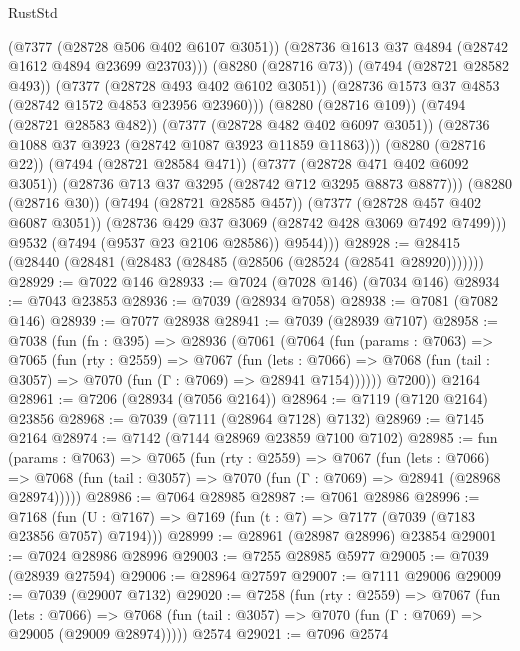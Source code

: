 \begin{lexlean}{RustStd}
\begin{coremodule}
                    (@7377 (@28728 @506 @402 @6107 @3051))
                    (@28736 @1613 @37 @4894 (@28742 @1612 @4894 @23699 @23703)))
                  (@8280 (@28716 @73))
                  (@7494 (@28721 @28582 @493))
                  (@7377 (@28728 @493 @402 @6102 @3051))
                  (@28736 @1573 @37 @4853 (@28742 @1572 @4853 @23956 @23960)))
                (@8280 (@28716 @109))
                (@7494 (@28721 @28583 @482))
                (@7377 (@28728 @482 @402 @6097 @3051))
                (@28736 @1088 @37 @3923 (@28742 @1087 @3923 @11859 @11863)))
              (@8280 (@28716 @22))
              (@7494 (@28721 @28584 @471))
              (@7377 (@28728 @471 @402 @6092 @3051))
              (@28736 @713 @37 @3295 (@28742 @712 @3295 @8873 @8877)))
            (@8280 (@28716 @30))
            (@7494 (@28721 @28585 @457))
            (@7377 (@28728 @457 @402 @6087 @3051))
            (@28736 @429 @37 @3069 (@28742 @428 @3069 @7492 @7499)))
          @9532
          (@7494 (@9537 @23 @2106 @28586))
          @9544)))
@28928 := @28415 (@28440 (@28481 (@28483 (@28485 (@28506 (@28524 (@28541 @28920)))))))
@28929 := @7022 @146
@28933 := @7024 (@7028 @146) (@7034 @146)
@28934 := @7043 @23853
@28936 := @7039 (@28934 @7058)
@28938 := @7081 (@7082 @146)
@28939 := @7077 @28938
@28941 := @7039 (@28939 @7107)
@28958 := @7038
    (fun (fn : @395) =>
    @28936
      (@7061
        (@7064
          (fun (params : @7063) =>
          @7065
            (fun (rty : @2559) =>
            @7067
              (fun (lets : @7066) =>
              @7068 (fun (tail : @3057) => @7070 (fun (Γ : @7069) => @28941 @7154))))))
        @7200))
    @2164
@28961 := @7206 (@28934 (@7056 @2164))
@28964 := @7119 (@7120 @2164) @23856
@28968 := @7039 (@7111 (@28964 @7128) @7132)
@28969 := @7145 @2164
@28974 := @7142 (@7144 @28969 @23859 @7100 @7102)
@28985 := fun (params : @7063) =>
  @7065
    (fun (rty : @2559) =>
    @7067
      (fun (lets : @7066) =>
      @7068 (fun (tail : @3057) => @7070 (fun (Γ : @7069) => @28941 (@28968 @28974)))))
@28986 := @7064 @28985
@28987 := @7061 @28986
@28996 := @7168
    (fun (U : @7167) => @7169 (fun (t : @7) => @7177 (@7039 (@7183 @23856 @7057) @7194)))
@28999 := @28961 (@28987 @28996) @23854
@29001 := @7024 @28986 @28996
@29003 := @7255 @28985 @5977
@29005 := @7039 (@28939 @27594)
@29006 := @28964 @27597
@29007 := @7111 @29006
@29009 := @7039 (@29007 @7132)
@29020 := @7258
    (fun (rty : @2559) =>
    @7067
      (fun (lets : @7066) =>
      @7068 (fun (tail : @3057) => @7070 (fun (Γ : @7069) => @29005 (@29009 @28974)))))
    @2574
@29021 := @7096 @2574

\end{coremodule}
\end{lexlean}
